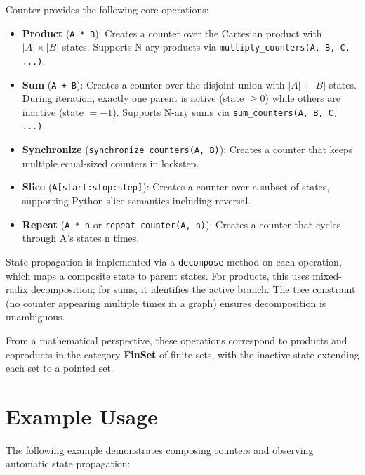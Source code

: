 \documentclass[10pt,a4paper,onecolumn]{article}
\begin{document}
Counter provides the following core operations:

\begin{itemize}
    \item \textbf{Product} (\texttt{A * B}): Creates a counter over the Cartesian 
    product with $|A| \times |B|$ states. Supports N-ary products via 
    \texttt{multiply\_counters(A, B, C, ...)}.
    
    \item \textbf{Sum} (\texttt{A + B}): Creates a counter over the disjoint union 
    with $|A| + |B|$ states. During iteration, exactly one parent is active 
    (state $\geq 0$) while others are inactive (state $= -1$). Supports N-ary 
    sums via \texttt{sum\_counters(A, B, C, ...)}.
    
    \item \textbf{Synchronize} (\texttt{synchronize\_counters(A, B)}): Creates a 
    counter that keeps multiple equal-sized counters in lockstep.
    
    \item \textbf{Slice} (\texttt{A[start:stop:step]}): Creates a counter over a 
    subset of states, supporting Python slice semantics including reversal.
    
    \item \textbf{Repeat} (\texttt{A * n} or \texttt{repeat\_counter(A, n)}): 
    Creates a counter that cycles through A's states n times.
\end{itemize}

State propagation is implemented via a \texttt{decompose} method on each operation, 
which maps a composite state to parent states. For products, this uses mixed-radix 
decomposition; for sums, it identifies the active branch. The tree constraint 
(no counter appearing multiple times in a graph) ensures decomposition is 
unambiguous.

From a mathematical perspective, these operations correspond to products and 
coproducts in the category \textbf{FinSet} of finite sets, with the inactive 
state extending each set to a pointed set.

\section{Example Usage}

The following example demonstrates composing counters and observing automatic 
state propagation:
\end{document}
